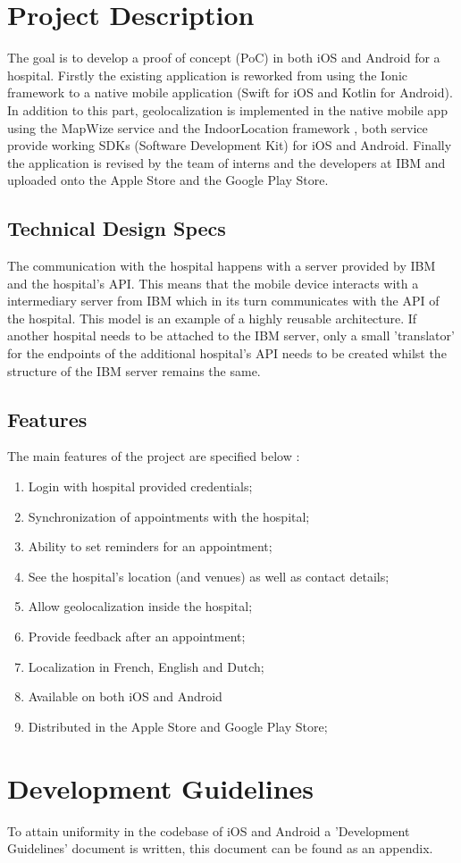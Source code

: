 \section{Project Description}
The goal is to develop a proof of concept (PoC) in both iOS and Android for a hospital. Firstly the existing application is reworked from using the Ionic framework to a native mobile application (Swift for iOS and Kotlin for Android). In addition to this part, geolocalization is implemented in the native mobile app using the MapWize service \cite{MapWize.io2019} and the IndoorLocation framework \cite{IndoorLocation.io2019}, both service provide working SDKs (Software Development Kit) for iOS and Android. Finally the application is revised by the team of interns and the developers at IBM and uploaded onto the Apple Store and the Google Play Store.
\subsection{Technical Design Specs}
The communication with the hospital happens with a server provided by IBM and the hospital's API. This means that the mobile device interacts with a intermediary server from IBM which in its turn communicates with the API of the hospital. This model is an example of a highly reusable architecture. If another hospital needs to be attached to the IBM server, only a small 'translator' for the endpoints of the additional hospital's API needs to be created whilst the structure of the IBM server remains the same.
\subsection{Features}
The main features of the project are specified below \cite{medappspec}:
\begin{enumerate}
\item Login with hospital provided credentials;
\item Synchronization of appointments with the hospital;
\item Ability to set reminders for an appointment;
\item See the hospital's location (and venues) as well as contact details;
\item Allow geolocalization inside the hospital;
\item Provide feedback after an appointment;
\item Localization in French, English and Dutch;
\item Available on both iOS and Android
\item Distributed in the Apple Store and Google Play Store;
\end{enumerate}
\section{Development Guidelines}
To attain uniformity in the codebase of iOS and Android a 'Development Guidelines' document is written, this document can be found as an appendix.